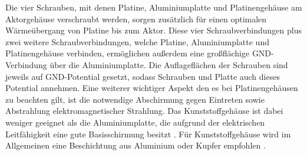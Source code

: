 Die vier Schrauben, mit denen Platine, Aluminiumplatte und Platinengehäuse am Aktorgehäuse verschraubt werden, sorgen zusätzlich für einen optimalen Wärmeübergang von Platine bis zum Aktor. Diese vier Schraubverbindungen plus zwei weitere Schraubverbindungen, welche Platine, Aluminiumplatte und Platinengehäuse verbinden, ermöglichen außerdem eine großflächige GND-Verbindung über die Aluminiumplatte. Die Auflageflächen der Schrauben sind jeweils auf GND-Potential gesetzt, sodass Schrauben und Platte auch dieses Potential annehmen.
Eine weiterer wichtiger Aspekt den es bei Platinengehäusen zu beachten gilt, ist die notwendige Abschirmung gegen Eintreten sowie Abstrahlung elektromagnetischer Strahlung. Das Kunststoffgehäuse ist dabei weniger geeignet als die Aluminiumplatte, die aufgrund der elektrischen Leitfähigkeit eine gute Basisschirmung besitzt \cite{bopla}. Für Kunststoffgehäuse wird im Allgemeinen eine Beschichtung aus Aluminium oder Kupfer empfohlen \cite{Gwinner2006}.

